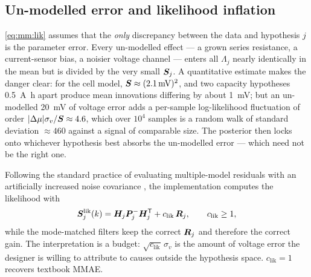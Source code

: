 \subsection{Un-modelled error and likelihood inflation}
\eqref{eq:mm:lik} assumes that the \emph{only} discrepancy between the data and hypothesis $j$ is
the parameter error.  Every un-modelled effect --- a grown series resistance, a current-sensor bias,
a noisier voltage channel --- enters all $\Lambda_j$ nearly identically in the mean but is divided by
the very small $\bm{S}_j$.  A quantitative estimate makes the danger clear: for the cell model,
$\bm{S}\approx(\SI{2.1}{\milli\volt})^2$, and two capacity hypotheses \SI{0.5}{\ampere\hour} apart
produce mean innovations differing by about \SI{1}{\milli\volt}; but an un-modelled
\SI{20}{\milli\volt} of voltage error adds a per-sample log-likelihood fluctuation of order
$|\Delta\mu|\sigma_v/\bm{S} \approx 4.6$, which over $10^4$ samples is a random walk of standard
deviation $\approx460$ against a signal of comparable size.  The posterior then locks onto whichever
hypothesis best absorbs the un-modelled error --- which need not be the right one.

Following the standard practice of evaluating multiple-model residuals with an artificially
increased noise covariance \cite[Ch.~10]{maybeck1979}\cite{hanlon2000mmae}, the implementation
computes the likelihood with
\begin{equation}
\bm{S}_j^{\text{lik}}(k) = \bm{H}_j\bm{P}^{-}_j\bm{H}_j^{\mathsf{T}} + c_{\text{lik}}\,\bm{R}_j, \qquad c_{\text{lik}}\ge1,
\label{eq:mm:clik}
\end{equation}
while the mode-matched filters keep the correct $\bm{R}_j$ and therefore the correct gain.  The
interpretation is a budget: $\sqrt{c_{\text{lik}}}\,\sigma_v$ is the amount of voltage error the
designer is willing to attribute to causes outside the hypothesis space.  $c_{\text{lik}}=1$
recovers textbook MMAE.

